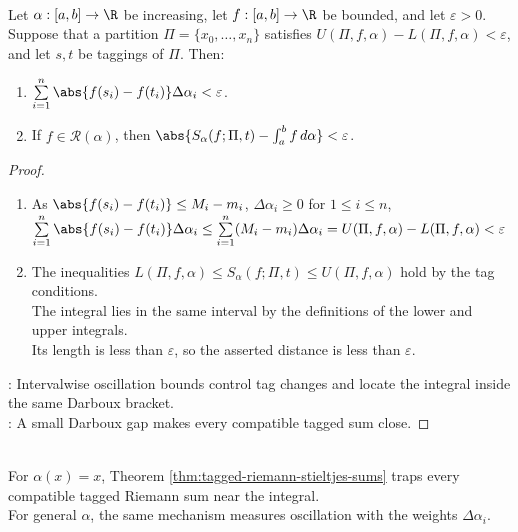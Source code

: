 \begin{theorem} \label{thm:tagged-riemann-stieltjes-sums} \\
Let $\alpha:[a,b]\to\R$ be increasing, let $f:[a,b]\to\R$ be bounded, and let $\varepsilon>0$.\\
Suppose that a partition $\Pi=\{x_0,\ldots,x_n\}$ satisfies $U(\Pi,f,\alpha)-L(\Pi,f,\alpha)<\varepsilon$, and let $s,t$ be taggings of $\Pi$. Then:
\begin{enumerate}[label=(\roman*)]
\setlength{\itemsep}{0pt}
\item $\sum\limits_{i=1}^{n}\abs{f(s_i)-f(t_i)}\Delta\alpha_i<\varepsilon$.
\item If $f\in\mathcal{R}(\alpha)$, then $\abs{S_\alpha(f;\Pi,t)-\int_a^b f\,d\alpha}<\varepsilon$.
\end{enumerate}
\begin{proof}
\begin{enumerate}[label=(\roman*)]
\setlength{\itemsep}{0pt}
\item As $\abs{f(s_i)-f(t_i)}\leq M_i-m_i$, $\Delta\alpha_i\geq0$ for $1\leq i\leq n$, $\sum\limits_{i=1}^{n}\abs{f(s_i)-f(t_i)}\Delta\alpha_i \leq\sum\limits_{i=1}^{n}(M_i-m_i)\Delta\alpha_i =U(\Pi,f,\alpha)-L(\Pi,f,\alpha)<\varepsilon$
\item The inequalities $L(\Pi,f,\alpha)\leq S_\alpha(f;\Pi,t)\leq U(\Pi,f,\alpha)$ hold by the tag conditions.\\
The integral lies in the same interval by the definitions of the lower and upper integrals.\\
Its length is less than $\varepsilon$, so the asserted distance is less than $\varepsilon$.
\end{enumerate}
: Intervalwise oscillation bounds control tag changes and locate the integral inside the same Darboux bracket.\\
: A small Darboux gap makes every compatible tagged sum close.
\end{proof}
\end{theorem}

\begin{perspective} \label{per:darboux-and-riemann-sum-definitions} \\
For $\alpha(x)=x$, Theorem \ref{thm:tagged-riemann-stieltjes-sums} traps every compatible tagged Riemann sum near the integral.\\
For general $\alpha$, the same mechanism measures oscillation with the weights $\Delta\alpha_i$.
\end{perspective}

